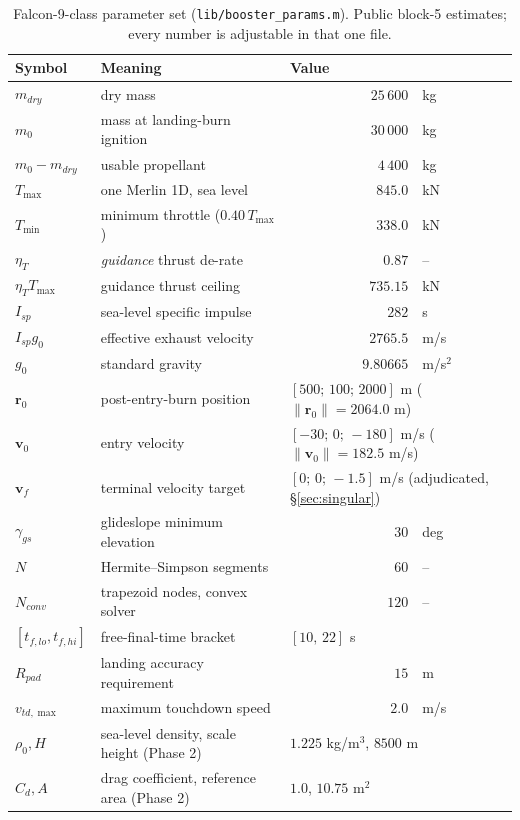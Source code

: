 \documentclass[11pt]{article}
\newcommand{\rvec}{\mathbf{r}}
\newcommand{\vvec}{\mathbf{v}}
\newcommand{\Tmin}{T_{\min}}
\newcommand{\Tmax}{T_{\max}}
\newcommand{\etaT}{\eta_T}
\begin{document}
\begin{table}[htbp]
\centering
\caption{Falcon-9-class parameter set (\texttt{lib/booster\_params.m}).
Public block-5 estimates; every number is adjustable in that one file.}
\label{tab:params}
\begin{tabular}{llr@{\;}l}
\toprule
Symbol & Meaning & \multicolumn{2}{l}{Value} \\
\midrule
$m_{dry}$      & dry mass                              & $25\,600$ & kg \\
$m_0$          & mass at landing-burn ignition         & $30\,000$ & kg \\
$m_0 - m_{dry}$& usable propellant                     & $4\,400$ & kg \\
$\Tmax$        & one Merlin 1D, sea level              & $845.0$ & kN \\
$\Tmin$        & minimum throttle ($0.40\,\Tmax$)      & $338.0$ & kN \\
$\etaT$        & \emph{guidance} thrust de-rate        & $0.87$ & -- \\
$\etaT \Tmax$  & guidance thrust ceiling               & $735.15$ & kN \\
$I_{sp}$       & sea-level specific impulse            & $282$ & s \\
$I_{sp} g_0$   & effective exhaust velocity            & $2765.5$ & m/s \\
$g_0$          & standard gravity                      & $9.80665$ & m/s$^2$ \\
\midrule
$\rvec_0$      & post-entry-burn position              & \multicolumn{2}{l}{$[500;\,100;\,2000]$ m ($\lVert\rvec_0\rVert = 2064.0$ m)} \\
$\vvec_0$      & entry velocity                        & \multicolumn{2}{l}{$[-30;\,0;\,-180]$ m/s ($\lVert\vvec_0\rVert = 182.5$ m/s)} \\
$\vvec_f$      & terminal velocity target              & \multicolumn{2}{l}{$[0;\,0;\,-1.5]$ m/s (adjudicated, \S\ref{sec:singular})} \\
$\gamma_{gs}$  & glideslope minimum elevation          & $30$ & deg \\
\midrule
$N$            & Hermite--Simpson segments             & $60$ & -- \\
$N_{conv}$     & trapezoid nodes, convex solver        & $120$ & -- \\
$[t_{f,lo}, t_{f,hi}]$ & free-final-time bracket       & \multicolumn{2}{l}{$[10,\,22]$ s} \\
\midrule
$R_{pad}$      & landing accuracy requirement          & $15$ & m \\
$v_{td,\max}$  & maximum touchdown speed               & $2.0$ & m/s \\
\midrule
$\rho_0, H$    & sea-level density, scale height (Phase 2) & \multicolumn{2}{l}{$1.225$ kg/m$^3$, $8500$ m} \\
$C_d, A$       & drag coefficient, reference area (Phase 2)& \multicolumn{2}{l}{$1.0$, $10.75$ m$^2$} \\
\bottomrule
\end{tabular}
\end{table}
\end{document}
